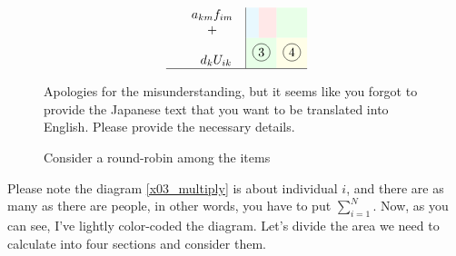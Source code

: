 \documentclass{ltjsbook}
\begin{document}
\begin{figure}[ht]
\[\begin{array}{rl|cccccc|}
			        & \begin{array}{c}a_{km}f_{im}\\+\end{array}            & \multicolumn{4}{>{\columncolor{cyan!9}}c}{}             & \multicolumn{1}{>{\columncolor{red!9}}c}{}               & \multicolumn{1}{>{\columncolor{green!9}}c}{}                                                                                                  \\
			        & \hspace{7pt}\begin{array}{c}\\d_kU_{ik}\\ \end{array} & \multicolumn{5}{>{\columncolor{green!9}}c}{\circled{3}} & \multicolumn{1}{>{\columncolor{yellow!9}}c}{\circled{4}}                                                                                                                                                 \\\hline
		\end{array}
	\]
	\caption{Consider a round-robin among the items}
	Apologies for the misunderstanding, but it seems like you forgot to provide the Japanese text that you want to be translated into English. Please provide the necessary details.
\end{figure}

Please note the diagram \ref{x03_multiply} is about individual $i$, and there are as many as there are people, in other words, you have to put $\sum_{i=1}^N$.
Now, as you can see, I've lightly color-coded the diagram. Let's divide the area we need to calculate into four sections and consider them.

\end{document}

